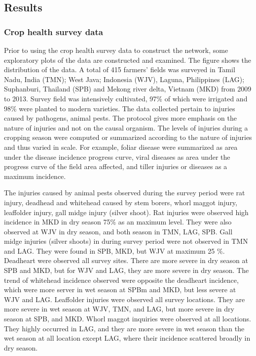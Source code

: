 \subsection{Results}

\subsubsection{Crop health survey data}

Prior to using the crop health survey data to construct the network, some exploratory plots of the data are constructed and examined. The figure shows the distribution of the data. A total of 415 farmers' fields was surveyed in Tamil Nadu, India (TMN); West Java; Indonesia (WJV), Laguna, Philippines (LAG); Suphanburi, Thailand (SPB) and Mekong river delta, Vietnam (MKD) from 2009 to 2013. Survey field was intensively cultivated, 97\% of which were irrigated and 98\% were planted to modern varieties. The data collected pertain to injuries caused by pathogens, animal pests. The protocol gives more emphasis on the nature of injuries and not on the causal organism. The levels of injuries during a cropping season were computed or summarized according to the nature of injuries and thus varied in scale. For example, foliar disease were summarized as area under the disease incidence progress curve, viral diseases as area under the progress curve of the field area affected, and tiller injuries or diseases as a maximum incidence. 

The injuries caused by animal pests observed during the survey period were rat injury, deadhead and whitehead caused by stem borers, whorl maggot injury, leaffolder injury, gall midge injury (silver shoot). Rat injuries were observed high incidence in MKD in dry season 75\% as an maximum level. They were also observed at WJV in dry season, and both season in TMN, LAG, SPB. Gall midge injuries (silver shoots) in during survey period were not observed in TMN and LAG. They were found in SPB, MKD, but WJV at maximum 25 \%. Deadheart were observed all survey sites. There are more severe in dry season at SPB and MKD, but for WJV and LAG, they are  more severe in dry season. The trend of whitehead incidence observed were opposite the deadheart incidence, which were more server in wet season at SPBm and MKD, but less severe at WJV and LAG. Leaffolder injuries were observed all survey locations. They are more severe in wet season at WJV, TMN, and LAG, but more severe in dry season at SPB, and MKD. Whorl maggot inquiries were observed at all locations. They highly occurred in LAG, and they are more severe in wet season than the wet season at all location except LAG, where their incidence scattered broadly in dry season.

